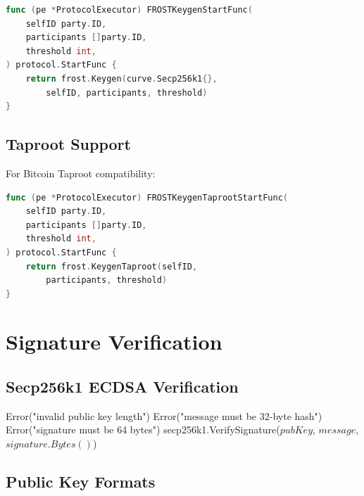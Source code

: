 \documentclass[11pt,twocolumn]{article}
\begin{document}
\begin{lstlisting}[language=Go,basicstyle=\ttfamily\small]
func (pe *ProtocolExecutor) FROSTKeygenStartFunc(
    selfID party.ID,
    participants []party.ID,
    threshold int,
) protocol.StartFunc {
    return frost.Keygen(curve.Secp256k1{},
        selfID, participants, threshold)
}
\end{lstlisting}

\subsection{Taproot Support}

For Bitcoin Taproot compatibility:

\begin{lstlisting}[language=Go,basicstyle=\ttfamily\small]
func (pe *ProtocolExecutor) FROSTKeygenTaprootStartFunc(
    selfID party.ID,
    participants []party.ID,
    threshold int,
) protocol.StartFunc {
    return frost.KeygenTaproot(selfID,
        participants, threshold)
}
\end{lstlisting}

\section{Signature Verification}

\subsection{Secp256k1 ECDSA Verification}

\begin{algorithm}
\caption{ECDSA Signature Verification}
\label{alg:ecdsa-verify}
\begin{algorithmic}[1]
        \State \Return Error("invalid public key length")
    \EndIf
        \State \Return Error("message must be 32-byte hash")
    \EndIf
        \State \Return Error("signature must be 64 bytes")
    \EndIf
    \State \Return secp256k1.VerifySignature($pubKey$, $message$, $signature.Bytes()$)
\EndProcedure
\end{algorithmic}
\end{algorithm}

\subsection{Public Key Formats}
\end{document}
